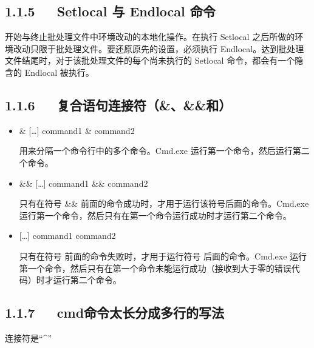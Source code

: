 \documentclass[letterpaper,12pt,english]{sphinxmanual}
\begin{document}
\subsection{1.1.5   Setlocal 与 Endlocal 命令}
\label{\detokenize{001software/002usage/bat:setlocal-endlocal}}
开始与终止批处理文件中环境改动的本地化操作。在执行 Setlocal 之后所做的环境改动只限于批处理文件。要还原原先的设置，必须执行 Endlocal。达到批处理文件结尾时，对于该批处理文件的每个尚未执行的 Setlocal 命令，都会有一个隐含的 Endlocal 被执行。


\subsection{1.1.6   复合语句连接符（\&、\&\&和\textbar{}\textbar{}）}
\label{\detokenize{001software/002usage/bat:id2}}\begin{itemize}
\item {} 
\& {[}…{]} command1 \& command2

用来分隔一个命令行中的多个命令。Cmd.exe 运行第一个命令，然后运行第二个命令。

\item {} 
\&\& {[}…{]} command1 \&\& command2

只有在符号 \&\& 前面的命令成功时，才用于运行该符号后面的命令。Cmd.exe 运行第一个命令，然后只有在第一个命令运行成功时才运行第二个命令。

\item {} 
\textbar{}\textbar{} {[}…{]} command1 \textbar{}\textbar{} command2

只有在符号 \textbar{}\textbar{} 前面的命令失败时，才用于运行符号 \textbar{}\textbar{} 后面的命令。Cmd.exe 运行第一个命令，然后只有在第一个命令未能运行成功（接收到大于零的错误代码）时才运行第二个命令。

\end{itemize}


\subsection{1.1.7   cmd命令太长分成多行的写法}
\label{\detokenize{001software/002usage/bat:cmd}}
连接符是“\textasciicircum{}”

\begin{sphinxVerbatim}[commandchars=\\\{\}]
  
\end{sphinxVerbatim}
\end{document}
